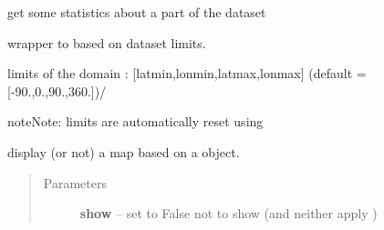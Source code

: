 \documentclass[letterpaper,10pt,english]{sphinxmanual}
\begin{document}
\begin{fulllineitems}
\begin{fulllineitems}
\end{fulllineitems}


\begin{fulllineitems}
\label{altimetry.data:altimetry.data.hydro_data.get_stats}
get some statistics about a part of the dataset

\end{fulllineitems}


\begin{fulllineitems}
\label{altimetry.data:altimetry.data.hydro_data.in_limits}
wrapper to  based on dataset limits.

\end{fulllineitems}


\begin{fulllineitems}
\label{altimetry.data:altimetry.data.hydro_data.limit}
limits of the domain : {[}latmin,lonmin,latmax,lonmax{]} (default = {[}-90.,0.,90.,360.{]})/

\begin{notice}{note}{Note:}
limits are automatically reset using 
\end{notice}

\end{fulllineitems}


\begin{fulllineitems}
\label{altimetry.data:altimetry.data.hydro_data.map}
display (or not) a map based on a  object.
\begin{quote}\begin{description}
\item[{Parameters}] \leavevmode
\textbf{show} -- set to False not to show (and neither apply )


\end{description}
\end{quote}
\end{fulllineitems}
\end{fulllineitems}
\end{document}
